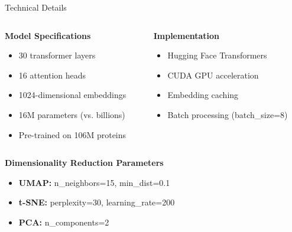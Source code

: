\documentclass[aspectratio=169]{beamer}
\begin{document}
\begin{frame}{Technical Details}
  \begin{columns}
    \begin{column}{0.5\textwidth}
      \textbf{Model Specifications}
      \begin{itemize}\small
        \item 30 transformer layers 
        \item 16 attention heads
        \item 1024-dimensional embeddings
        \item 16M parameters (vs. billions)
        \item Pre-trained on 106M proteins
      \end{itemize}
    \end{column}
    \begin{column}{0.5\textwidth}
      \textbf{Implementation}
      \begin{itemize}\small
        \item Hugging Face Transformers
        \item CUDA GPU acceleration
        \item Embedding caching
        \item Batch processing (batch\_size=8)
      \end{itemize}
    \end{column}
  \end{columns}
  
  \textbf{Dimensionality Reduction Parameters}
  \begin{itemize}\small
    \item \textbf{UMAP:} n\_neighbors=15, min\_dist=0.1
    \item \textbf{t-SNE:} perplexity=30, learning\_rate=200
    \item \textbf{PCA:} n\_components=2
  \end{itemize}
\end{frame}
\end{document}
